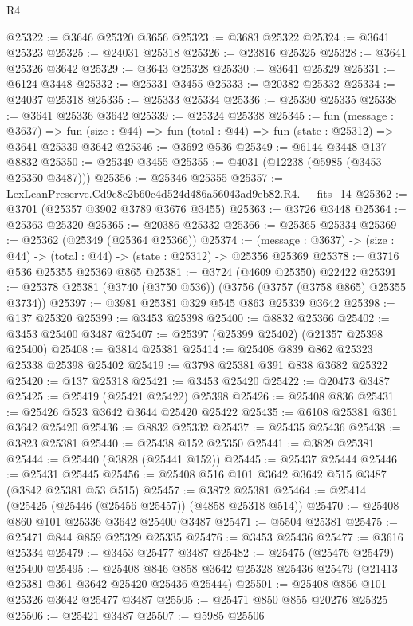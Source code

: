 \begin{lexlean}{R4}
\begin{coremodule}
@25322 := @3646 @25320 @3656
@25323 := @3683 @25322
@25324 := @3641 @25323
@25325 := @24031 @25318
@25326 := @23816 @25325
@25328 := @3641 @25326 @3642
@25329 := @3643 @25328
@25330 := @3641 @25329
@25331 := @6124 @3448
@25332 := @25331 @3455
@25333 := @20382 @25332
@25334 := @24037 @25318
@25335 := @25333 @25334
@25336 := @25330 @25335
@25338 := @3641 @25336 @3642
@25339 := @25324 @25338
@25345 := fun (message : @3637) =>
  fun (size : @44) => fun (total : @44) => fun (state : @25312) => @3641 @25339 @3642
@25346 := @3692 @536
@25349 := @6144 @3448 @137 @8832
@25350 := @25349 @3455
@25355 := @4031 (@12238 (@5985 (@3453 @25350 @3487)))
@25356 := @25346 @25355
@25357 := LexLeanPreserve.Cd9c8c2b60c4d524d486a56043ad9eb82.R4.__fits_14
@25362 := @3701 (@25357 @3902 @3789 @3676 @3455)
@25363 := @3726 @3448
@25364 := @25363 @25320
@25365 := @20386 @25332
@25366 := @25365 @25334
@25369 := @25362 (@25349 (@25364 @25366))
@25374 := (message : @3637) -> (size : @44) -> (total : @44) -> (state : @25312) -> @25356 @25369
@25378 := @3716 @536 @25355 @25369 @865
@25381 := @3724 (@4609 @25350) @22422
@25391 := @25378 @25381 (@3740 (@3750 @536)) (@3756 (@3757 (@3758 @865) @25355 @3734))
@25397 := @3981 @25381 @329 @545 @863 @25339 @3642
@25398 := @137 @25320
@25399 := @3453 @25398
@25400 := @8832 @25366
@25402 := @3453 @25400 @3487
@25407 := @25397 (@25399 @25402) (@21357 @25398 @25400)
@25408 := @3814 @25381
@25414 := @25408 @839 @862 @25323 @25338 @25398 @25402
@25419 := @3798 @25381 @391 @838 @3682 @25322
@25420 := @137 @25318
@25421 := @3453 @25420
@25422 := @20473 @3487
@25425 := @25419 (@25421 @25422) @25398
@25426 := @25408 @836
@25431 := @25426 @523 @3642 @3644 @25420 @25422
@25435 := @6108 @25381 @361 @3642 @25420
@25436 := @8832 @25332
@25437 := @25435 @25436
@25438 := @3823 @25381
@25440 := @25438 @152 @25350
@25441 := @3829 @25381
@25444 := @25440 (@3828 (@25441 @152))
@25445 := @25437 @25444
@25446 := @25431 @25445
@25456 := @25408 @516 @101 @3642 @3642 @515 @3487 (@3842 @25381 @53 @515)
@25457 := @3872 @25381
@25464 := @25414 (@25425 (@25446 (@25456 @25457)) (@4858 @25318 @514))
@25470 := @25408 @860 @101 @25336 @3642 @25400 @3487
@25471 := @5504 @25381
@25475 := @25471 @844 @859 @25329 @25335
@25476 := @3453 @25436
@25477 := @3616 @25334
@25479 := @3453 @25477 @3487
@25482 := @25475 (@25476 @25479) @25400
@25495 := @25408
    @846
    @858
    @3642
    @25328
    @25436
    @25479
    (@21413 @25381 @361 @3642 @25420 @25436 @25444)
@25501 := @25408 @856 @101 @25326 @3642 @25477 @3487
@25505 := @25471 @850 @855 @20276 @25325
@25506 := @25421 @3487
@25507 := @5985 @25506

\end{coremodule}
\end{lexlean}
